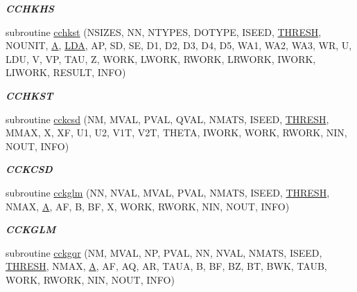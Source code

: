 \begin{DoxyCompactItemize}
\begin{DoxyCompactList}\small\item\em {\bfseries C\+C\+H\+K\+H\+S} \end{DoxyCompactList}\item 
subroutine \hyperlink{group__complex__eig_ga525d1a2df6511f9a488f0dd914a45baa}{cchkst} (N\+S\+I\+Z\+E\+S, N\+N, N\+T\+Y\+P\+E\+S, D\+O\+T\+Y\+P\+E, I\+S\+E\+E\+D, \hyperlink{zlaqgs_8c_a0656018abfc9fa2821827415f5d5ea57}{T\+H\+R\+E\+S\+H}, N\+O\+U\+N\+I\+T, \hyperlink{classA}{A}, \hyperlink{example__user_8c_ae946da542ce0db94dced19b2ecefd1aa}{L\+D\+A}, A\+P, S\+D, S\+E, D1, D2, D3, D4, D5, W\+A1, W\+A2, W\+A3, W\+R, U, L\+D\+U, V, V\+P, T\+A\+U, Z, W\+O\+R\+K, L\+W\+O\+R\+K, R\+W\+O\+R\+K, L\+R\+W\+O\+R\+K, I\+W\+O\+R\+K, L\+I\+W\+O\+R\+K, R\+E\+S\+U\+L\+T, I\+N\+F\+O)
\begin{DoxyCompactList}\small\item\em {\bfseries C\+C\+H\+K\+S\+T} \end{DoxyCompactList}\item 
subroutine \hyperlink{group__complex__eig_gab577d9fd38a6d67157f0b7a22090bd76}{cckcsd} (N\+M, M\+V\+A\+L, P\+V\+A\+L, Q\+V\+A\+L, N\+M\+A\+T\+S, I\+S\+E\+E\+D, \hyperlink{zlaqgs_8c_a0656018abfc9fa2821827415f5d5ea57}{T\+H\+R\+E\+S\+H}, M\+M\+A\+X, X, X\+F, U1, U2, V1\+T, V2\+T, T\+H\+E\+T\+A, I\+W\+O\+R\+K, W\+O\+R\+K, R\+W\+O\+R\+K, N\+I\+N, N\+O\+U\+T, I\+N\+F\+O)
\begin{DoxyCompactList}\small\item\em {\bfseries C\+C\+K\+C\+S\+D} \end{DoxyCompactList}\item 
subroutine \hyperlink{group__complex__eig_ga02f888d1e47ac0a876793161ada51c49}{cckglm} (N\+N, N\+V\+A\+L, M\+V\+A\+L, P\+V\+A\+L, N\+M\+A\+T\+S, I\+S\+E\+E\+D, \hyperlink{zlaqgs_8c_a0656018abfc9fa2821827415f5d5ea57}{T\+H\+R\+E\+S\+H}, N\+M\+A\+X, \hyperlink{classA}{A}, A\+F, B, B\+F, X, W\+O\+R\+K, R\+W\+O\+R\+K, N\+I\+N, N\+O\+U\+T, I\+N\+F\+O)
\begin{DoxyCompactList}\small\item\em {\bfseries C\+C\+K\+G\+L\+M} \end{DoxyCompactList}\item 
subroutine \hyperlink{group__complex__eig_gac0da4fbc5a2c02b848f49c0dd9c3f893}{cckgqr} (N\+M, M\+V\+A\+L, N\+P, P\+V\+A\+L, N\+N, N\+V\+A\+L, N\+M\+A\+T\+S, I\+S\+E\+E\+D, \hyperlink{zlaqgs_8c_a0656018abfc9fa2821827415f5d5ea57}{T\+H\+R\+E\+S\+H}, N\+M\+A\+X, \hyperlink{classA}{A}, A\+F, A\+Q, A\+R, T\+A\+U\+A, B, B\+F, B\+Z, B\+T, B\+W\+K, T\+A\+U\+B, W\+O\+R\+K, R\+W\+O\+R\+K, N\+I\+N, N\+O\+U\+T, I\+N\+F\+O)

\end{DoxyCompactItemize}
